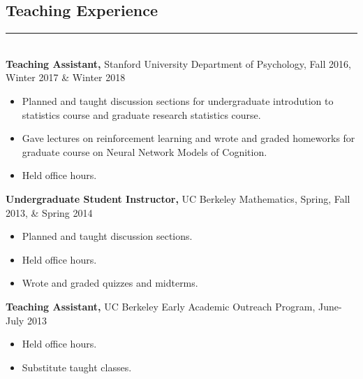 \documentclass[margin]{res}
\begin{document}
\begin{resume}
\vspace{1pt}\section{Teaching Experience} \vspace{-15pt} \rule{\textwidth}{0.5pt} \\[3pt]
{\bf Teaching Assistant,} Stanford University Department of Psychology, Fall 2016, Winter 2017 \& Winter 2018
\begin{itemize} \itemsep -2pt
  \item Planned and taught discussion sections for undergraduate introdution to statistics course and graduate research statistics course. \item Gave lectures on reinforcement learning and wrote and graded homeworks for graduate course on Neural Network Models of Cognition. \item Held office hours. \end{itemize}\vspace{-8pt}
{\bf Undergraduate Student Instructor,} UC Berkeley Mathematics, Spring, Fall 2013, \& Spring 2014 
\begin{itemize} \itemsep -2pt
  \item Planned and taught discussion sections. \item Held office hours. \item Wrote and graded quizzes and midterms. \end{itemize}\vspace{-8pt}
{\bf Teaching Assistant,} UC Berkeley Early Academic Outreach Program, June-July 2013
\begin{itemize} \itemsep -2pt
 \item Held office hours. \item Substitute taught classes. \end{itemize}


\end{resume}
\end{document}
